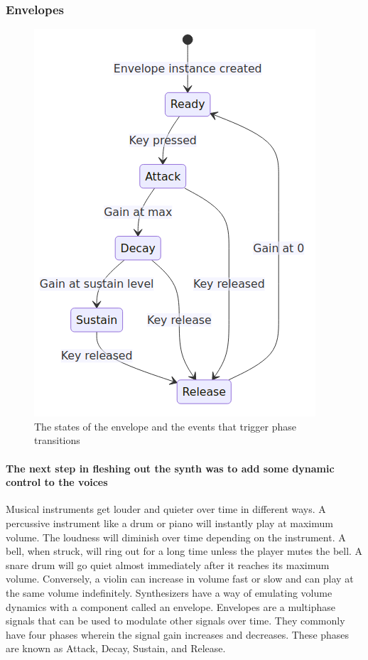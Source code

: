 \documentclass[acmlarge,screen]{acmart}
\begin{document}
	
	\subsubsection{Envelopes}
	
	\begin{figure}
		\centering
		\caption{The states of the envelope and the events that trigger phase transitions}
		\includegraphics[width=.8\linewidth]{envelope_state_diagram}
	\end{figure}
	
	\paragraph{The next step in fleshing out the synth was to add some dynamic control to the voices} Musical instruments get louder and quieter over time in different ways. A percussive instrument like a drum or piano will instantly play at maximum volume. The loudness will diminish over time depending on the instrument. A bell, when struck, will ring out for a long time unless the player mutes the bell. A snare drum will go quiet almost immediately after it reaches its maximum volume. Conversely, a violin can increase in volume fast or slow and can play at the same volume indefinitely. Synthesizers have a way of emulating volume dynamics with a component called an envelope. Envelopes are a multiphase signals that can be used to modulate other signals over time. They commonly have four phases wherein the signal gain increases and decreases. These phases are known as Attack, Decay, Sustain, and Release.
	
\end{document}
